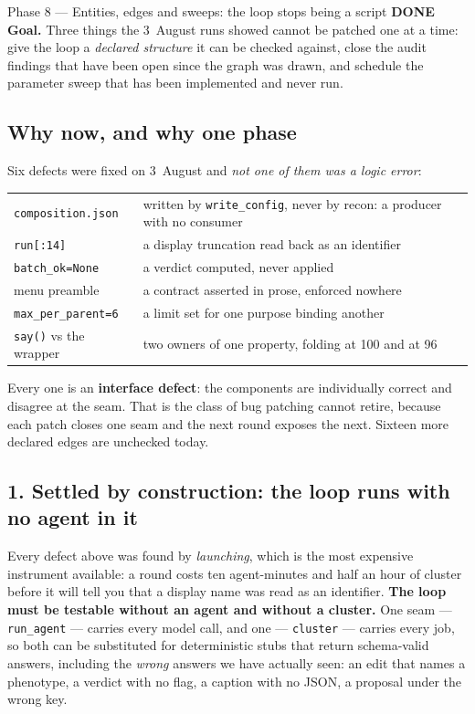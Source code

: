 \documentclass[11pt,a4paper]{article}
\newcommand{\code}[1]{\texttt{#1}}
\newcommand{\done}{\textcolor{good}{\textbf{DONE}}}
\begin{document}
\begin{phasebox}{Phase 8 --- Entities, edges and sweeps: the loop stops being a script \hfill \done}
\textbf{Goal.} Three things the 3~August runs showed cannot be patched one at a time: give the loop
a \emph{declared structure} it can be checked against, close the audit findings that have been
open since the graph was drawn, and schedule the parameter sweep that has been implemented and
never run.

\subsection*{Why now, and why one phase}
Six defects were fixed on 3~August and \emph{not one of them was a logic error}:

\begin{center}
\begin{tabular}{@{}lp{7.4cm}@{}}
\code{composition.json} & written by \code{write\_config}, never by recon: a producer with no
consumer \\
\code{run[:14]} & a display truncation read back as an identifier \\
\code{batch\_ok=None} & a verdict computed, never applied \\
menu preamble & a contract asserted in prose, enforced nowhere \\
\code{max\_per\_parent=6} & a limit set for one purpose binding another \\
\code{say()} vs the wrapper & two owners of one property, folding at 100 and at 96 \\
\end{tabular}
\end{center}

\noindent Every one is an \textbf{interface defect}: the components are individually correct and
disagree at the seam. That is the class of bug patching cannot retire, because each patch closes
one seam and the next round exposes the next. Sixteen more declared edges are unchecked today.

\subsection*{1. Settled by construction: the loop runs with no agent in it}
Every defect above was found by \emph{launching}, which is the most expensive instrument available:
a round costs ten agent-minutes and half an hour of cluster before it will tell you that a display
name was read as an identifier. \textbf{The loop must be testable without an agent and without a
cluster.} One seam --- \code{run\_agent} --- carries every model call, and one --- \code{cluster}
--- carries every job, so both can be substituted for deterministic stubs that return
schema-valid answers, including the \emph{wrong} answers we have actually seen: an edit that names
a phenotype, a verdict with no flag, a caption with no JSON, a proposal under the wrong key.


\end{phasebox}
\end{document}
